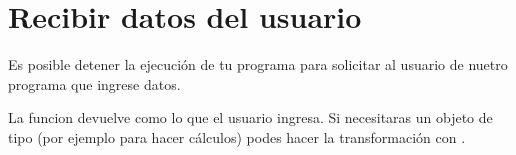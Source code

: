 \documentclass[a4paper,12pt,spanish]{sphinxmanual}
\begin{document}
\sphinxstepscope


\chapter{Recibir datos del usuario }
\label{\detokenize{input:recibir-datos-del-usuario-input}}\label{\detokenize{input::doc}}
\sphinxAtStartPar
Es posible detener la ejecución de tu programa para solicitar
al usuario de nuetro programa que ingrese datos.

\begin{sphinxVerbatim}[commandchars=\\\{\}]
  
  
\end{sphinxVerbatim}

\sphinxAtStartPar
La funcion  devuelve como  lo que el usuario ingresa.
Si necesitaras un objeto de tipo  (por ejemplo para hacer cálculos)
podes hacer la transformación con .
\end{document}
